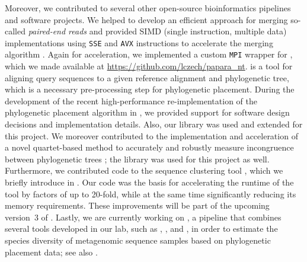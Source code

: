 Moreover, we contributed to several other open-source bioinformatics pipelines and software projects.
We helped to develop an efficient approach for merging so-called \emph{paired-end reads}
and provided SIMD (single instruction, multiple data) implementations using \texttt{SSE} and \texttt{AVX} instructions
to accelerate the merging algorithm \cite{Flouri2017}.
Again for acceleration, we implemented a custom \texttt{\acs{MPI}} wrapper for  \cite{Berger2011a,Berger2012},
which we made available at \url{https://github.com/lczech/papara_nt}.
 is a tool for aligning query sequences to a given reference alignment and phylogenetic tree,
which is a necessary pre-processing step for phylogenetic placement.
During the development of the recent high-performance re-implementation of the phylogenetic placement algorithm
in  \cite{Barbera2018}, we provided support for software design decisions and implementation details.
Also, our  library was used and extended for this project.
We moreover contributed to the implementation and acceleration of a novel quartet-based method to accurately and robustly
measure incongruence between phylogenetic trees \cite{Zhou2017};
the  library was used for this project as well.
Furthermore, we contributed code to the sequence clustering tool  \cite{Mahe2014,Mahe2015},
which we briefly introduce in .
Our code was the basis for accelerating the runtime of the tool by factors of up to \num{20}-fold,
while at the same time significantly reducing its memory requirements.
These improvements will be part of the upcoming version~3 of .
Lastly, we are currently working on ,
a pipeline that combines several tools developed in our lab, such as
 \cite{Barbera2018},  \cite{Morel2019}, and  \cite{Kapli2017},
in order to estimate the species diversity of metagenomic sequence samples based on phylogenetic placement data;
see also .



